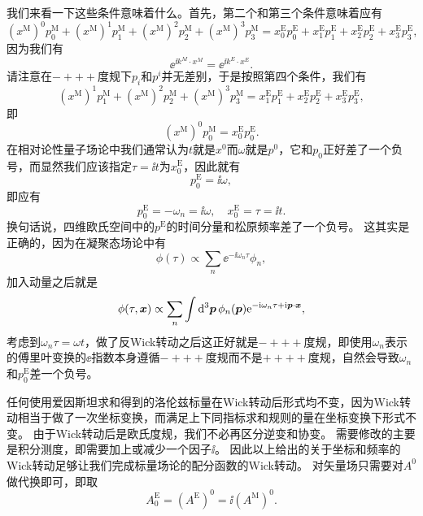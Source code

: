 我们来看一下这些条件意味着什么。首先，第二个和第三个条件意味着应有
\[
    (x^\text{M})^0 p^\text{M}_0 + (x^\text{M})^1 p^\text{M}_1 + (x^\text{M})^2 p^\text{M}_2 + (x^\text{M})^3 p^\text{M}_3 = x^\text{E}_0 p^\text{E}_0 + x^\text{E}_1 p^\text{E}_1 + x^\text{E}_2 p^\text{E}_2 + x^\text{E}_3 p^\text{E}_3,
\]
因为我们有
\[
    \ee^{\ii k^M \cdot x^M} = \ee^{\ii k^E \cdot x^E}.
\]
请注意在$-+++$度规下$p_i$和$p^i$并无差别，于是按照第四个条件，我们有
\[
    (x^\text{M})^1 p^\text{M}_1 + (x^\text{M})^2 p^\text{M}_2 + (x^\text{M})^3 p^\text{M}_3 = x^\text{E}_1 p^\text{E}_1 + x^\text{E}_2 p^\text{E}_2 + x^\text{E}_3 p^\text{E}_3,
\]
即
\[
    (x^\text{M})^0 p^\text{M}_0 = x^\text{E}_0 p^\text{E}_0.
\]
在相对论性量子场论中我们通常认为$t$就是$x^0$而$\omega$就是$p^0$，它和$p_0$正好差了一个负号，而显然我们应该指定$\tau=\ii t$为$x^\text{E}_0$，因此就有
\[
    p_0^\text{E} = \ii \omega,
\]
即应有
\begin{equation}
    p_0^\text{E} = - \omega_n = \ii \omega, \quad x^\text{E}_0 = \tau = \ii t.
\end{equation}
换句话说，四维欧氏空间中的$p^\text{E}$的时间分量和松原频率差了一个负号。
这其实是正确的，因为在凝聚态场论中有
\[
    \phi(\tau) \propto \sum_n \ee^{-\ii \omega_n \tau} \phi_n,
\]
加入动量之后就是
\[
    \phi(\tau, \vb*{x}) \propto \sum_n \int \dd[3]{\vb*{p}} \phi_n(\vb*{p}) \mathrm{e}^{-\mathrm{i} \omega_n \tau + \mathrm{i} \vb*{p} \cdot \vb*{x}} , 
\]
考虑到$\omega_n \tau = \omega t$，做了反Wick转动之后这正好就是$-+++$度规，即使用$\omega_n$表示的傅里叶变换的$\ee$指数本身遵循$-+++$度规而不是$++++$度规，自然会导致$\omega_n$和$p^\text{E}_0$差一个负号。

任何使用爱因斯坦求和得到的洛伦兹标量在Wick转动后形式均不变，因为Wick转动相当于做了一次坐标变换，而满足上下同指标求和规则的量在坐标变换下形式不变。
由于Wick转动后是欧氏度规，我们不必再区分逆变和协变。
需要修改的主要是积分测度，即需要加上或减少一个因子$\ii$。
因此以上给出的关于坐标和频率的Wick转动足够让我们完成标量场论的配分函数的Wick转动。
对矢量场只需要对$A^0$做代换即可，即取
\begin{equation}
    A^\text{E}_0 = (A^\text{E})^0 = \ii (A^\text{M})^0.
\end{equation}

